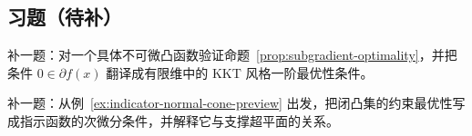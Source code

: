 \subsection*{习题（待补）}

\begin{exercise}[次梯度最优性占位]\label{exr:subgradient-optimality-placeholder}
补一题：对一个具体不可微凸函数验证命题~\ref{prop:subgradient-optimality}，并把条件 $0\in\partial f(x)$ 翻译成有限维中的 KKT 风格一阶最优性条件。
\end{exercise}

\begin{exercise}[法锥桥接题占位]\label{exr:normal-cone-placeholder}
补一题：从例~\ref{ex:indicator-normal-cone-preview} 出发，把闭凸集的约束最优性写成指示函数的次微分条件，并解释它与支撑超平面的关系。
\end{exercise}
